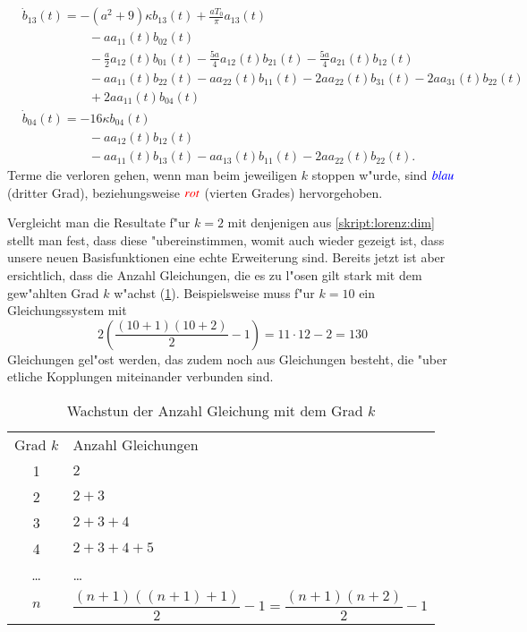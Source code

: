 \begin{align*}
\\
&
\dot{b}_{13}(t)
=
-
(a^2+9)
\kappa
b_{13}(t)
+
\frac{a T_{0}}{\pi} a_{13}(t)
\\
&\phantom{aaaaaaaaaa}
-
a
a_{11}(t) b_{02}(t)
\\
&\phantom{aaaaaaaaaa}
-
\frac{a}{2} a_{12}(t) b_{01}(t)
-
\frac{5 a}{4} a_{12}(t) b_{21}(t)
-
\frac{5 a}{4} a_{21}(t) b_{12}(t)
\\
&\phantom{aaaaaaaaaa}
-
a
a_{11}(t) b_{22}(t)
-
a
a_{22}(t) b_{11}(t)
-
2 a
a_{22}(t) b_{31}(t)
-
2 a
a_{31}(t) b_{22}(t)
\\
&\phantom{aaaaaaaaaa}
+
2 a
a_{11}(t) b_{04}(t)
\\
&
\dot{b}_{04}(t)
=
-
16
\kappa
b_{04}(t)
\\
&\phantom{aaaaaaaaaa}
-
a
a_{12}(t) b_{12}(t)
\\
&\phantom{aaaaaaaaaa}
-
a
a_{11}(t) b_{13}(t)
-
a
a_{13}(t) b_{11}(t)
-
2a
a_{22}(t) b_{22}(t).
\end{align*}
Terme die verloren gehen, wenn man beim jeweiligen $k$ stoppen w"urde, sind 
$\color{blue}{blau}$ (dritter Grad), beziehungsweise $\color{red}{rot}$ 
(vierten Grades) hervorgehoben.

Vergleicht man die Resultate f"ur $k = 2$ mit denjenigen aus 
\cref{skript:lorenz:dim} stellt man fest, dass diese "ubereinstimmen, womit 
auch wieder gezeigt ist, dass unsere neuen Basisfunktionen eine echte 
Erweiterung sind. Bereits jetzt ist aber ersichtlich, dass die Anzahl 
Gleichungen, die es zu l"osen gilt stark mit dem gew"ahlten Grad $k$ w"achst 
(\cref{table:lorenz2:degree}). Beispielsweise muss f"ur $k = 10$ ein 
Gleichungssystem mit
\begin{equation*}
	2\left(\frac{(10 + 1)(10 + 2)}{2} - 1\right) = 11 \cdot 12 - 2 = 130
\end{equation*}
Gleichungen gel"ost werden, das zudem noch aus Gleichungen besteht, die "uber 
etliche Kopplungen miteinander verbunden sind.

\begin{table}
	\centering
	\begin{tabular}{c | l}
		Grad $k$ & Anzahl Gleichungen \\
		1 & $2$ \\
		2 & $2 + 3$ \\
		3 & $2 + 3 + 4$\\
		4 & $2 + 3 + 4 + 5$\\
		\dots & \dots \\
		$n$ & $\dfrac{(n + 1)((n + 1) + 1)}{2} - 1
		= \dfrac{(n + 1)(n + 2)}{2} - 1$
	\end{tabular}
	\caption{Wachstun der Anzahl Gleichung mit dem Grad $k$}
	\label{table:lorenz2:degree}
\end{table}
